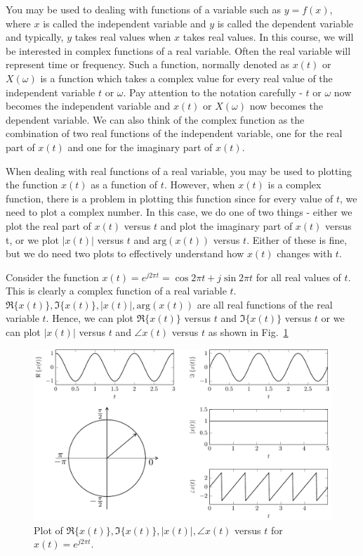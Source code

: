 You may be used to dealing with functions of a variable such as $y = f(x)$, where $x$ is called the independent variable and
$y$ is called the dependent variable and typically, $y$ takes real values when $x$ takes real values. In this course, we will be interested in complex functions of a real variable. Often the real variable will represent time or frequency. Such a function, normally denoted as $x(t)$ or $X(\omega)$ is a function which takes a complex value for every real value of the independent variable $t$ or $\omega$. Pay attention to the notation carefully - $t$ or $\omega$ now becomes the independent variable and $x(t)$ or $X(\omega)$ now becomes the dependent variable. We can also think of the complex function as the combination of two real functions of the independent variable, one for the real part of $x(t)$ and one for the imaginary part of $x(t)$.

When dealing with real functions of a real variable, you may be used to plotting the function $x(t)$ as a function of $t$. However, when $x(t)$ is a complex function, there is a problem in plotting this function since for every value of $t$, we need to plot a complex number. In this case, we do one of two things - either we plot the real part of $x(t)$ versus $t$ and plot the imaginary part of $x(t)$ versus t, or we plot $|x(t)|$ versus $t$ and $\mbox{arg}(x(t))$ versus $t$. Either of these is fine, but we do need two plots to effectively understand how $x(t)$ changes with $t$.

\begin{example} Consider the function  $x(t) = e^{j2\pi t} = \cos {2\pi t} +  j \sin {2\pi t}$ for all real values of $t$.
This is clearly a complex function of a real variable $t$. $\Re\{x(t)\}, \Im\{x(t)\}, |x(t)|, \mbox{arg}(x(t))$ are all real functions of the real variable $t$. Hence, we can plot $\Re\{x(t)\}$ versus $t$ and $\Im\{x(t)\}$ versus $t$ or we can plot $|x(t)|$ versus $t$ and $\angle x(t)$ versus $t$ as shown in Fig.~\ref{fig:x(t)example1}
\begin{figure}[hbtp]
\begin{center}
\includegraphics[width=6.0in]{../Images/ComplexNumbers/Fig_0_4.pdf}
%
\end{center}
\caption{Plot of $\Re\{x(t)\}, \Im\{x(t)\}, |x(t)|, \angle x(t)$ versus $t$ for $x(t) = e^{j 2 \pi t}$.}
\label{fig:x(t)example1}
\end{figure}
\end{example}

